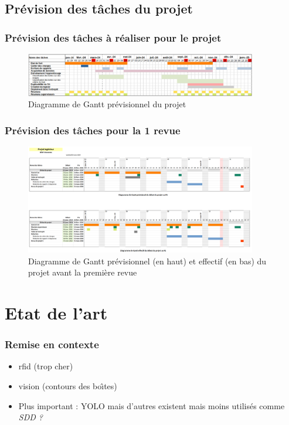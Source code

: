 \documentclass[aspectratio = 43]{beamer}
\begin{document}
\subsection{Pr{\'e}vision des t{\^a}ches du projet}
\begin{frame}
  \frametitle{Pr{\'e}vision des t{\^a}ches {\`a} r{\'e}aliser pour le projet}
  \begin{figure}
    \centering
    \includegraphics[width=0.9\textwidth]{gantt_projet.png}
    \caption{Diagramme de Gantt prévisionnel du projet}%
    \label{fig:gantt_projet}
  \end{figure}
\end{frame}
%
\begin{frame}
  \frametitle{Pr{\'e}vision des t{\^a}ches pour la 1\iere{} revue}
  \begin{figure}
    \centering
    \includegraphics[width=0.9\textwidth, height=0.7\textheight]{gantt_r1.png}
    \caption{Diagramme de Gantt prévisionnel (en haut) et effectif (en
      bas) du projet avant la première revue}%
    \label{fig:gantt_r1}
  \end{figure}
\end{frame}
%
\section{Etat de l'art}
\begin{frame}
  \frametitle{Remise en contexte}
  \begin{itemize}
  \item rfid (trop cher)
  \item vision (contours des bo{\^\i}tes)
  \item Plus important : YOLO mais d'autres existent mais moins
    utilis{\'e}s comme \textit{SDD ?}
  \end{itemize}
\end{frame}
%
\end{document}
